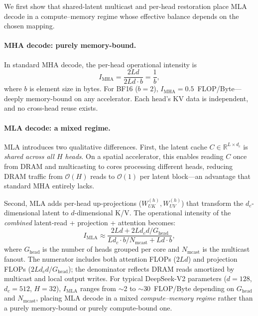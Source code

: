 \documentclass[sigconf, review, anonymous]{acmart}
\newcommand{\sharedLatentMulticast}{shared-latent multicast}
\newcommand{\Ghead}{G_{\mathrm{head}}}
\begin{document}

We first show that \sharedLatentMulticast{} and per-head restoration
place MLA decode in a compute--memory regime whose effective balance
depends on the chosen mapping.

\paragraph{MHA decode: purely memory-bound.}
In standard MHA decode, the per-head operational intensity is
\begin{equation}\label{eq:oi-mha}
  I_{\text{MHA}} = \frac{2Ld}{2Ld \cdot b} = \frac{1}{b} ,
\end{equation}
where $b$ is element size in bytes.  For BF16 ($b{=}2$),
$I_{\text{MHA}} = 0.5$~FLOP/Byte---deeply memory-bound on any
accelerator.  Each head's KV data is independent, and no cross-head
reuse exists.

\paragraph{MLA decode: a mixed regime.}
MLA introduces two qualitative differences.  First, the latent cache
$C \in \mathbb{R}^{L \times d_c}$ is \emph{shared across all $H$
heads}.  On a spatial accelerator, this enables reading $C$ once
from DRAM and multicasting to cores processing different heads,
reducing DRAM traffic from $\mathcal{O}(H)$ reads to $\mathcal{O}(1)$
per latent block---an advantage that standard MHA entirely lacks.

Second, MLA adds per-head up-projections ($W_{UK}^{(h)}, W_{UV}^{(h)}$)
that transform the $d_c$-dimensional latent to $d$-dimensional K/V.
The operational intensity of the \emph{combined} latent-read +
projection + attention becomes:
\begin{equation}\label{eq:oi-mla}
  I_{\text{MLA}} \approx \frac{2Ld + 2Ld_c d / \Ghead}{L d_c \cdot b / N_{\text{mcast}} + L d \cdot b},
\end{equation}
where $\Ghead$ is the number of heads grouped per core and
$N_{\text{mcast}}$ is the multicast fanout.  The numerator includes
both attention FLOPs ($2Ld$) and projection FLOPs ($2Ld_c d/\Ghead$);
the denominator reflects DRAM reads amortized by multicast and local
output writes.  For typical DeepSeek-V2 parameters ($d{=}128$,
$d_c{=}512$, $H{=}32$), $I_{\text{MLA}}$ ranges from $\sim$2 to
$\sim$30~FLOP/Byte depending on $\Ghead$ and $N_{\text{mcast}}$,
placing MLA decode in a mixed \emph{compute--memory regime} rather than
a purely memory-bound or purely compute-bound one.
\end{document}
